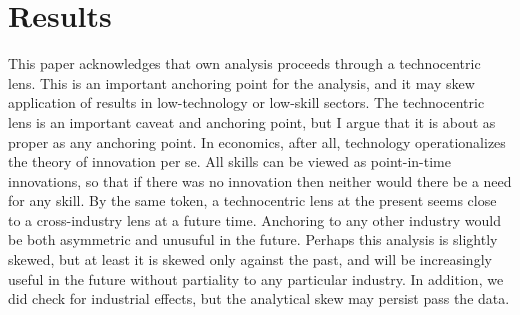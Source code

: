 \documentclass[review]{elsarticle}
\begin{document}

%

\section{Results}

This paper acknowledges that own analysis proceeds through a technocentric lens.
This is an important anchoring point for the analysis, and it may skew application of results in low-technology or low-skill sectors.
The technocentric lens is an important caveat and anchoring point, but I argue that it is about as proper as any anchoring point.
In economics, after all, technology operationalizes the theory of innovation per se.
All skills can be viewed as point-in-time innovations, so that if there was no innovation then neither would there be a need for any skill.
By the same token, a technocentric lens at the present seems close to a cross-industry lens at a future time.
Anchoring to any other industry would be both asymmetric and unusuful in the future.
Perhaps this analysis is slightly skewed, but at least it is skewed only against the past, and will be increasingly useful in the future without partiality to any particular industry.
In addition, we did check for industrial effects, but the analytical skew may persist pass the data.
\end{document}
